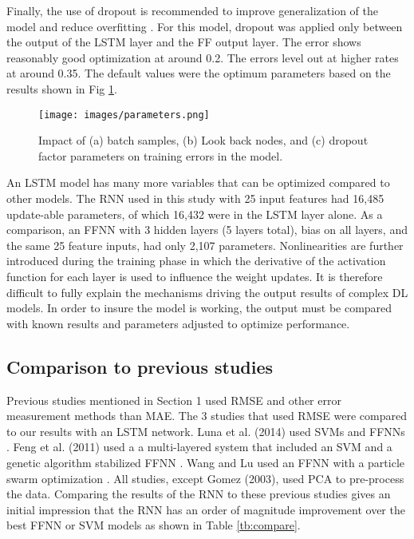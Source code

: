 \begin{linenumbers}
Finally, the use of dropout is recommended to improve generalization of the model and reduce overfitting \citep{Gal2016}. For this model, dropout was applied only between the output of the LSTM layer and the FF output layer. The error shows reasonably good optimization at around 0.2. The errors level out at higher rates at around 0.35. The default values were the optimum parameters based on the results shown in Fig \ref{fig:parameters}.
%
\begin{figure}[!htb]
\centering
\texttt{[image: images/parameters.png]}
\caption[Impact of model parameters on training error]{Impact of (a) batch samples, (b) Look back nodes, and (c) dropout factor parameters on training errors in the model.}
\label{fig:parameters}
\end{figure}
%

An LSTM model has many more variables that can be optimized compared to other models. The RNN used in this study with 25 input features had 16,485 update-able parameters, of which 16,432 were in the LSTM layer alone. As a comparison, an FFNN with 3 hidden layers (5 layers total), bias on all layers, and the same 25 feature inputs, had only 2,107 parameters. Nonlinearities are further introduced during the training phase in which the derivative of the activation function for each layer is used to influence the weight updates. It is therefore difficult to fully explain the mechanisms driving the output results of complex DL models. In order to insure the model is working, the output must be compared with known results and parameters adjusted to optimize performance.

\subsection{Comparison to previous studies}
Previous studies mentioned in Section 1 used RMSE and other error measurement methods than MAE. The 3 studies that used RMSE were compared to our results with an LSTM network. Luna et al. (2014) used SVMs and FFNNs \citep{Luna2014}. Feng et al. (2011) used a a multi-layered system that included an SVM and a genetic algorithm stabilized FFNN \citep{Feng2011}. Wang and Lu used an FFNN with a particle swarm optimization \citep{Wang2006}. All studies, except Gomez (2003), used PCA to pre-process the data. Comparing the results of the RNN to these previous studies gives an initial impression  that the RNN has an order of magnitude improvement over the best FFNN or SVM models as shown in Table \ref{tb:compare}.
%
\end{linenumbers}
